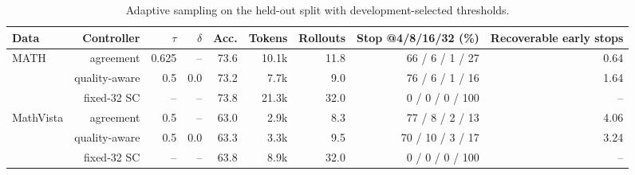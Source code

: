 \begin{table}[t]
\centering
\scriptsize
\begin{tabular}{lrrrrrrrr}
\toprule
Data & Controller & $\tau$ & $\delta$ & Acc. & Tokens & Rollouts & Stop @4/8/16/32 (\%) & Recoverable early stops \\
\midrule
MATH & agreement & 0.625 & -- & 73.6 & 10.1k & 11.8 & 66 / 6 / 1 / 27 & 0.64 \\
 & quality-aware & 0.5 & 0.0 & 73.2 & 7.7k & 9.0 & 76 / 6 / 1 / 16 & 1.64 \\
 & fixed-32 SC & -- & -- & 73.8 & 21.3k & 32.0 & 0 / 0 / 0 / 100 & -- \\
\midrule
MathVista & agreement & 0.5 & -- & 63.0 & 2.9k & 8.3 & 77 / 8 / 2 / 13 & 4.06 \\
 & quality-aware & 0.5 & 0.0 & 63.3 & 3.3k & 9.5 & 70 / 10 / 3 / 17 & 3.24 \\
 & fixed-32 SC & -- & -- & 63.8 & 8.9k & 32.0 & 0 / 0 / 0 / 100 & -- \\
\bottomrule
\end{tabular}
\caption{Adaptive sampling on the held-out split with development-selected thresholds.}
\label{tab:t3-adaptive}
\end{table}
